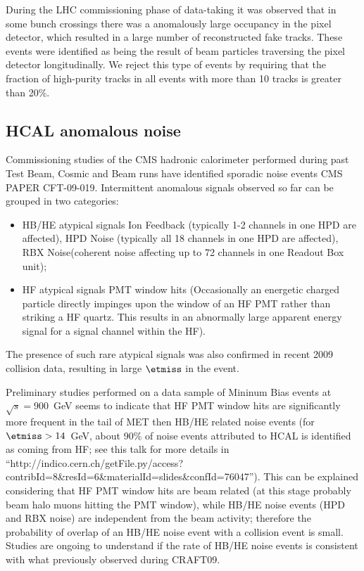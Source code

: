 During the LHC commissioning phase of data-taking it was observed that
in some bunch crossings there was a anomalously large occupancy in the
pixel detector, which resulted in a large number of reconstructed fake
tracks. These events were identified as being the result of beam
particles traversing the pixel detector longitudinally. We reject this
type of events by requiring that the fraction of high-purity tracks in
all events with more than 10 tracks is greater than 20\%.

\subsection{HCAL anomalous noise}
Commissioning studies of the CMS hadronic calorimeter performed 
during past Test Beam, Cosmic and Beam runs have identified 
sporadic noise events CMS PAPER CFT-09-019.
Intermittent anomalous signals observed so far can be grouped in two categories:
\begin{itemize}
\item{HB/HE atypical signals} Ion Feedback (typically 1-2 channels in one HPD are affected), 
HPD Noise (typically all 18 channels in one HPD are affected), RBX Noise(coherent noise affecting up to 
72 channels in one Readout Box unit);
\item{HF atypical signals} PMT window hits (Occasionally an energetic charged particle directly impinges 
upon the window of an HF PMT rather than striking a HF quartz. This results in an abnormally large 
apparent energy signal for a signal channel within the HF). 
\end{itemize}

The presence of such rare atypical signals was also confirmed in recent 2009 collision data, 
resulting in large $\etmiss$ in the event. 

Preliminary studies performed on a data sample of Mininum Bias events at $\sqrt{s}=900$~GeV 
seems to indicate that HF PMT window hits are significantly more frequent in the tail of MET
then HB/HE related noise events (for $\etmiss>14$~GeV, about 90\% of noise events attributed 
to HCAL is identified as coming from HF; see this talk for more details in 
``http://indico.cern.ch/getFile.py/access?contribId=8\&resId=6\&materialId=slides\&confId=76047'').
This can be explained considering that HF PMT window hits are beam related 
(at this stage probably beam halo muons hitting the PMT window), 
while HB/HE noise events (HPD and RBX noise) are independent from the beam activity; 
therefore the probability of overlap of an HB/HE noise event with a collision event is small.
Studies are ongoing to understand if the rate of HB/HE noise events is consistent with what 
previously observed during CRAFT09.

